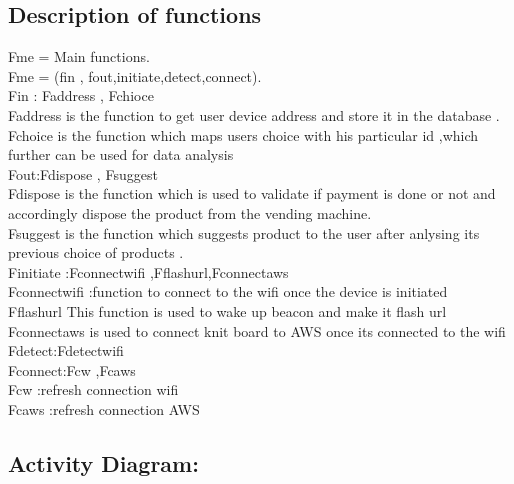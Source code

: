 \documentclass[oneside,a4paper,12pt]{report}
\begin{document}
\subsection{Description of functions}  

Fme = Main functions.\\
Fme = (fin , fout,initiate,detect,connect).\\
Fin : {Faddress , Fchioce}\\
Faddress is the function to get user device address and store it in the database .
Fchoice is the function which maps users choice with his particular id ,which further can be used for data analysis \\
Fout:{Fdispose , Fsuggest}\\
Fdispose is the function which is used to validate if payment is done or not and accordingly dispose the product from the vending machine.\\
Fsuggest is the function which suggests product to the user after anlysing its previous choice of products .\\
Finitiate :{Fconnectwifi ,Fflashurl,Fconnectaws}\\
Fconnectwifi :function to connect to the wifi once the device is initiated\\
Fflashurl This function is used to wake up beacon and make it flash url\\
Fconnectaws is used to connect knit board to AWS once its connected to the wifi\\
Fdetect:{Fdetectwifi}\\
Fconnect:{Fcw ,Fcaws}\\
Fcw :refresh connection wifi\\
Fcaws :refresh connection AWS\\
\subsection{Activity Diagram:}
\end{document}
